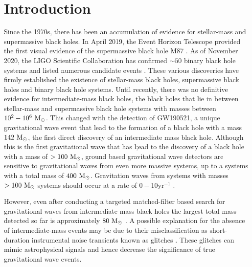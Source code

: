 \documentclass[%
 amsmath,amssymb,
 aps,
twocolumn
]{revtex4}
\newcommand{\mathcmd}[1]{{\sc \relax\ifmmode#1\else $#1$\fi}\xspace}
\newcommand{\msun}{\mathcmd{\text{M}_\odot}}
\begin{document}
\section{\label{sec:Introduction}Introduction}
Since the 1970s, there has been an accumulation of evidence for stellar-mass and supermassive black holes. In April 2019, the Event Horizon Telescope provided the first visual evidence of the supermassive black hole M87 \cite{m87photo}. As of November 2020, the LIGO Scientific Collaboration has confirmed $\sim50$ binary black hole systems and listed numerous candidate events \cite{GWTC1, GWTC2, IAS0, IAS1, IAS2, pycbc_ogc_2}. These various discoveries have firmly established the existence of stellar-mass black holes, supermassive black holes and binary black hole systems. Until recently, there was no definitive evidence for intermediate-mass black holes, the black holes that lie in between stellar-mass and supermassive black hole systems with masses between $10^2-10^6\ \msun$. This changed with the detection of GW190521, a unique gravitational wave event that lead to the formation of a black hole with a mass  $142\ \msun$, the first direct discovery of an intermediate mass black hole. Although this is the first gravitational wave that has l;ead to the discovery of a black hole with a mass of $>100\ \msun$, ground based gravitational wave detectors are sensitive to gravitational waves from even more massive systems, up to a systems with a total mass of $400\ \msun$. Gravitation waves from systems with masses $>100\ \msun$ systems should occur at a rate of $0-10\text{yr}^{-1}$ \cite{fregeau2006imbhbRatePrediction, mandel2008rates,rodriguez2015bbhRatePredictions,ligo_imbh_search}. 

However, even after conducting a targeted matched-filter based search for gravitational waves from intermediate-mass black holes the largest total mass detected so far is approximately $80\ \msun$ \cite{imbhbSearch2014, ligo_imbh_search, abbott2019gwtc}. A possible explanation for the absence of intermediate-mass events may be due to their misclassification as short-duration instrumental noise transients known as glitches \cite{glitch_in_fifth_ligo_run, bayeswave, improving_dq_in_early_runs, ligo_glitch_gw150914, pycbc_short_duration_transients, pe_with_glitch, blip_glitches}. These glitches can mimic astrophysical signals and hence decrease the significance of true gravitational wave events. 
\end{document}
